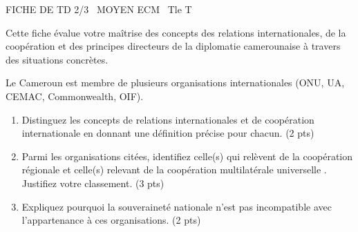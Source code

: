 \documentclass[11pt]{article}
\begin{document}
\begin{tcolorbox}[enhanced,colback=popink,colframe=popink,arc=10pt,boxrule=0pt,left=12pt,right=12pt,top=9pt,bottom=9pt]
{\color{white}\popxbold\small FICHE DE TD 2/3 \textbullet\ MOYEN \hfill ECM \textbullet\ Tle T\par}
\end{tcolorbox}
\vspace{4pt}
Cette fiche évalue votre maîtrise des concepts des relations internationales, de la coopération et des principes directeurs de la diplomatie camerounaise à travers des situations concrètes.

\begin{exercice}
Le Cameroun est membre de plusieurs organisations internationales (ONU, UA, CEMAC, Commonwealth, OIF). 
\begin{enumerate}
    \item Distinguez les concepts de \og relations internationales \fg{} et de \og coopération internationale \fg{} en donnant une définition précise pour chacun. (2 pts)
    \item Parmi les organisations citées, identifiez celle(s) qui relèvent de la coopération \og régionale \fg{} et celle(s) relevant de la coopération \og multilatérale universelle \fg{}. Justifiez votre classement. (3 pts)
    \item Expliquez pourquoi la souveraineté nationale n'est pas incompatible avec l'appartenance à ces organisations. (2 pts)
\end{enumerate}
\end{exercice}
\end{document}

